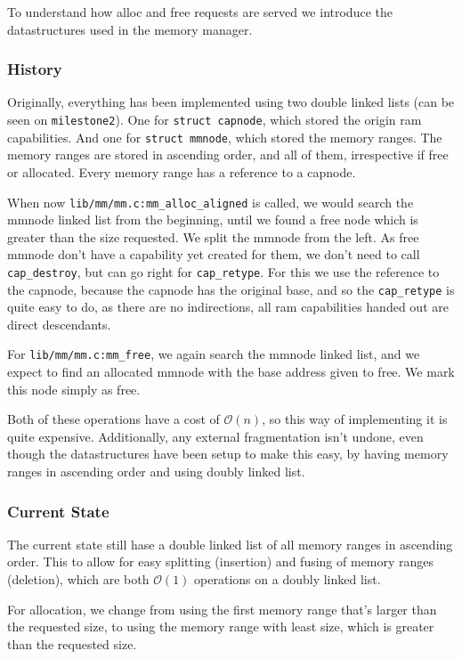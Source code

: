 To understand how alloc and free requests are served we introduce the
datastructures used in the memory manager.

\subsubsection{History}

Originally, everything has been implemented using two double linked lists (can
be seen on \verb|milestone2|).
One for \verb|struct capnode|, which stored the origin ram capabilities.
And one for \verb|struct mmnode|, which stored the memory ranges.
The memory ranges are stored in ascending order, and all of them, irrespective
if free or allocated.
Every memory range has a reference to a capnode.

When now \verb|lib/mm/mm.c:mm_alloc_aligned| is called, we would search the
mmnode linked list from the beginning, until we found a free node which is
greater than the size requested.
We split the mmnode from the left.
As free mmnode don't have a capability yet created for them, we don't need to
call \verb|cap_destroy|, but can go right for \verb|cap_retype|.
For this we use the reference to the capnode, because the capnode has the
original base, and so the \verb|cap_retype| is quite easy to do, as there are
no indirections, all ram capabilities handed out are direct descendants.

For \verb|lib/mm/mm.c:mm_free|, we again search the mmnode linked list, and we
expect to find an allocated mmnode with the base address given to free.
We mark this node simply as free.

Both of these operations have a cost of $\mathcal{O}(n)$, so this way of
implementing it is quite expensive.
Additionally, any external fragmentation isn't undone, even though the
datastructures have been setup to make this easy, by having memory ranges in
ascending order and using doubly linked list.

\subsubsection{Current State}

The current state still hase a double linked list of all memory ranges in
ascending order. This to allow for easy splitting (insertion) and fusing of
memory ranges (deletion), which are both $\mathcal{O}(1)$ operations on a doubly
linked list.

For allocation, we change from using the first memory range that's larger than
the requested size, to using the memory range with least size, which is greater
than the requested size.

